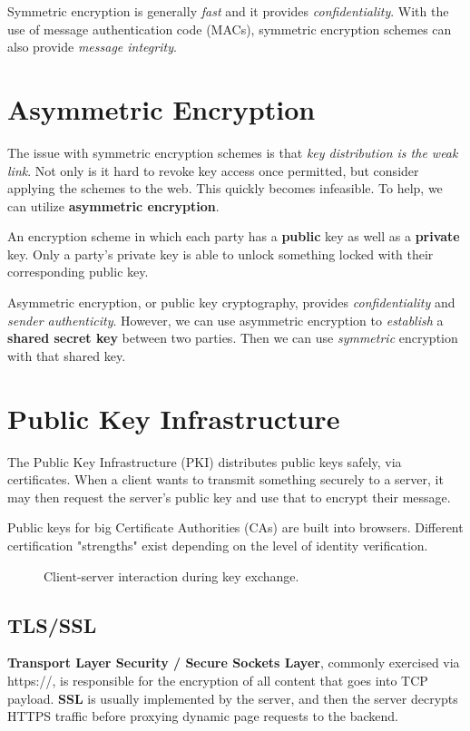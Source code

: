 Symmetric encryption is generally \emph{fast} and it provides \emph{confidentiality}. With the use of message authentication code (MACs), symmetric encryption schemes can also provide \emph{message integrity}.

\section{Asymmetric Encryption}
The issue with symmetric encryption schemes is that \emph{key distribution is the weak link}. Not only is it hard to revoke key access once permitted, but consider applying the schemes to the web. This quickly becomes infeasible. To help, we can utilize \textbf{asymmetric encryption}.

\begin{definition}
	An encryption scheme in which each party has a \textbf{public} key as well as a \textbf{private} key. Only a party's private key is able to unlock something locked with their corresponding public key.
\end{definition}

Asymmetric encryption, or public key cryptography, provides \emph{confidentiality} and \emph{sender authenticity}. However, we can use asymmetric encryption to \emph{establish} a \textbf{shared secret key} between two parties. Then we can use \emph{symmetric} encryption with that shared key.

\section{Public Key Infrastructure}
The Public Key Infrastructure (PKI) distributes public keys safely, via certificates. When a client wants to transmit something securely to a server, it may then request the server's public key and use that to encrypt their message. \par

Public keys for big Certificate Authorities (CAs) are built into browsers. Different certification "strengths" exist depending on the level of identity verification.

\begin{figure}[H]
	\centering
	\caption{Client-server interaction during key exchange.}
	\label{fig:asymsymkeyex}
\end{figure}

\subsection{TLS/SSL}
\textbf{Transport Layer Security / Secure Sockets Layer}, commonly exercised via https://, is responsible for the encryption of all content that goes into TCP payload. \textbf{SSL} is usually implemented by the server, and then the server decrypts HTTPS traffic before proxying dynamic page requests to the backend.

